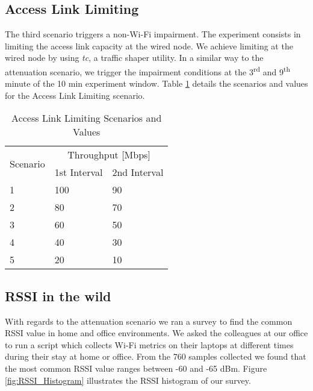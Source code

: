 \subsection*{Access Link Limiting}\label{access_link}

The third scenario triggers a non-Wi-Fi impairment. The experiment consists in limiting the access link capacity at the wired node. We achieve limiting at the wired node by using \emph{tc}, a traffic shaper utility. In a similar way to the attenuation scenario, we trigger the impairment conditions at the 3\textsuperscript{rd} and 9\textsuperscript{th} minute of the 10 min experiment window. Table \ref{table:Access_Link_Experiment_Values} details the scenarios and values for the Access Link Limiting scenario.

\begin{table}[h!]
	\begin{center}
		\begin{tabular}{|| m{5em} | m{2cm}| m{2cm} ||}
			\hline
			\multirow{2}{*}{Scenario} & \multicolumn{2}{c||}{Throughput {[}Mbps{]}} \\ \cline{2-3} 
			& \multicolumn{1}{l|}{1st Interval} & \multicolumn{1}{l||}{2nd Interval} \\ \hline\hline
			1 & 100 & 90 \\ \hline
			2 & 80 & 70 \\ \hline
			3 & 60 & 50 \\ \hline
			4 & 40 & 30 \\ \hline
			5 & 20 & 10 \\ \hline
		\end{tabular}
	\end{center}
	\caption{Access Link Limiting Scenarios and Values}
	\label{table:Access_Link_Experiment_Values}
\end{table}

\subsection{RSSI in the wild}\label{rsssi_in_the_wild}

With regards to the attenuation scenario we ran a survey to find the common RSSI value in home and office environments. We asked the colleagues at our office to run a script which collects Wi-Fi metrics on their laptops at different times during their stay at home or office. From the 760 samples collected we found that the most common RSSI value ranges between -60 and -65 dBm. Figure \ref{fig:RSSI_Histogram} illustrates the RSSI histogram of our survey.

